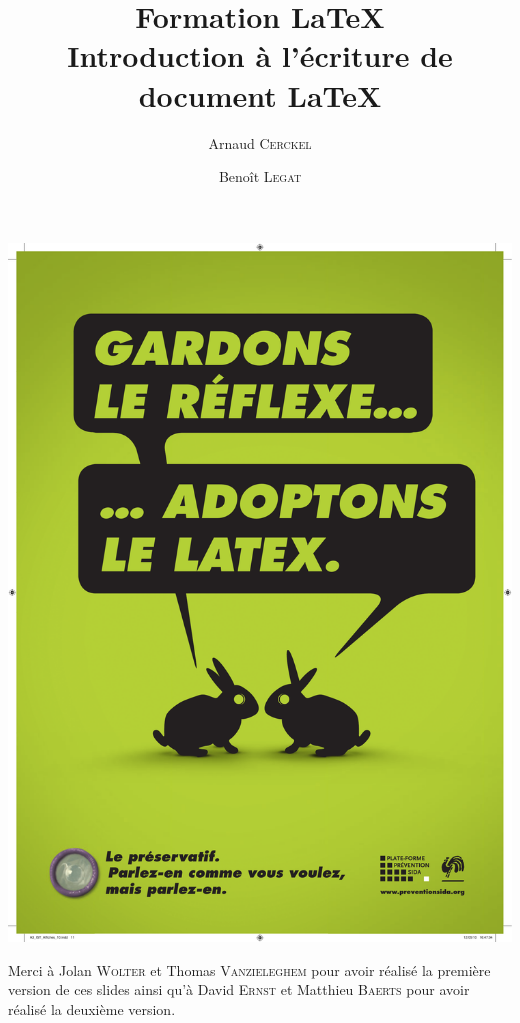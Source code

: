 \documentclass[10pt,svgnames,usenames,table]{beamer} %
\institute{Louvain-li-Nux}
\title{\textbf{Formation \LaTeX}\\
Introduction à l'écriture de document \textrm{\LaTeX}}
\author{Arnaud \textsc{Cerckel} \and Benoît \textsc{Legat}}
\begin{document}
\begin{landscape}
\begin{frame}
	\vspace{-.5cm}
	\hspace*{.1mm}
	\includegraphics[page=1,height=\paperwidth]{latex_sida.pdf}
\end{frame}
\end{landscape}

\begin{frame}
\maketitle
Merci à Jolan \textsc{Wolter} et Thomas \textsc{Vanzieleghem} pour avoir réalisé la première version de ces slides
ainsi qu'à David \textsc{Ernst} et Matthieu \textsc{Baerts} pour avoir réalisé la deuxième version.
\end{frame}
\end{document}
